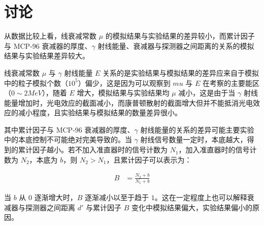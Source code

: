 \section{讨论}

从数据比较上看，线衰减常数 $\mu$ 的模拟结果与实验结果的差异较小，而累计因子与 MCP-96 衰减器的厚度、$\gamma$ 射线能量、衰减器与探测器之间距离的关系的模拟结果与实验结果差异较大。

线衰减常数 $\mu$ 与 $\gamma$ 射线能量 $E$ 关系的是实验结果与模拟结果的差异应来自于模拟中的粒子模拟个数（$10^5$）偏少，这是因为可以观察到 $mu$ 与 $E$ 在考察的主要能区（$0\sim2\si{MeV}$），随着 $E$ 增大，模拟结果与实验结果均 $\mu$ 减小，这是由于当 $\gamma$ 射线能量增加时，光电效应的截面减小，而康普顿散射的截面增大但并不能抵消光电效应的减小程度，且实验结果与模拟结果的数量差异很小。

其中累计因子与 MCP-96 衰减器的厚度、$\gamma$ 射线能量的关系的差异可能主要实验中的本底控制不可能绝对完美导致的。当 $\gamma$ 射线信号数量一定时，本底越大，得到的累计因子越小。若不加入准直器时的信号计数为 $N_1$，加入准直器时的信号计数为 $N_2$，本底为 $b$，则 $N_2 > N_1$，且累计因子可以表示为：

\begin{align}
    B &= \frac{N_2 + b}{N_1 + b}
\end{align}

当 $b$ 从 $0$ 逐渐增大时，$B$ 逐渐减小以至于趋于 $1$。这在一定程度上也可以解释衰减器与探测器之间距离 $d'$ 与累计因子 $B$ 变化中模拟结果偏大，实验结果偏小的原因。